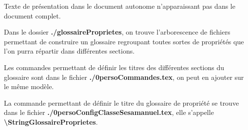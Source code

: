 \documentclass[nocrop]{../sesamanuel}
\begin{document}
Texte de présentation dans le document autonome n'apparaissant pas dans le document complet.

\medskip

Dans le dossier \textbf{./glossaireProprietes}, on trouve l'arborescence de fichiers permettant de construire un glossaire
regroupant toutes sortes de propriétés que l'on purra répartir dans différentes sections.

\medskip

Les commandes permettant de définir les titres des différentes sections du glossaire sont dans le fichier \textbf{./0persoCommandes.tex},
on peut en ajouter sur le même modèle.

\medskip

La commande permettant de définir le titre du glossaire de propriété se trouve dans le fichier \textbf{./0persoConfigClasseSesamanuel.tex},
elle s'appelle \textbf{\textbackslash StringGlossaireProprietes}.


\end{document}
